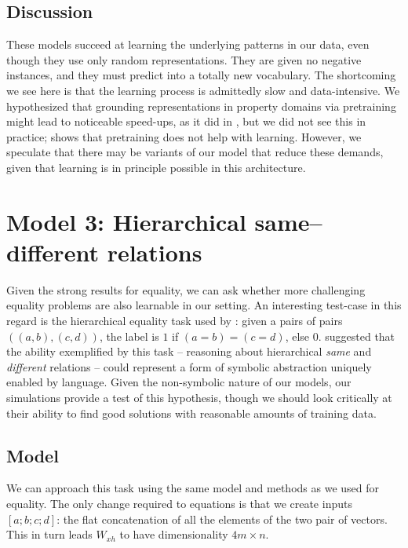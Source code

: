 \documentclass[9pt,twocolumn,twoside,lineno]{pnas-new}
\newcommand{\update}[1]{{\color{darkblue}#1}}
\begin{document}
\subsection{Discussion}

These models succeed at learning the underlying patterns in our data, even though they use only random representations.  They are given no negative instances, and they must predict into a totally new vocabulary. \update{The shortcoming we see here is that the learning process is admittedly slow and data-intensive. We hypothesized that grounding representations in property domains via pretraining might lead to noticeable speed-ups, as it did in \secref{sec:equality}, but we did not see this in practice;  \figref{fig:fuzzy-lm-pretrain-results} shows that pretraining does not help with learning.} However, we speculate that there may be variants of our model that reduce these demands, given that learning is in principle possible in this architecture.


\section{Model 3: Hierarchical same--different relations}\label{sec:premack}

Given the strong results for equality, we can ask whether more challenging equality problems are also learnable in our setting. An interesting test-case in this regard is the hierarchical equality task used by \citet{Premack:1983}: given a pairs of pairs $((a,b), (c,d))$, the label is $1$ if $(a = b) = (c = d)$, else $0$.  \citet{Premack:1983} suggested that the ability exemplified by this task -- reasoning about hierarchical \emph{same} and \emph{different} relations -- could represent a form of symbolic abstraction uniquely enabled by language.  Given the non-symbolic nature of our models, our simulations provide a test of this hypothesis, though we should look critically at their ability to find good solutions with reasonable amounts of training data.


\subsection{Model}

We can approach this task using the same model and methods as we used for equality. The only change required to equations  is that we create inputs $[a;b;c;d]$: the flat concatenation of all the elements of the two pair of vectors. This in turn leads $W_{xh}$ to have dimensionality $4m \times n$.
\end{document}
